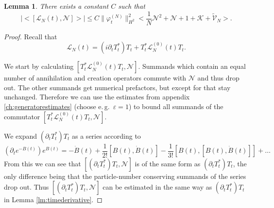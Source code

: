 \documentclass[11pt,a4paper,draft,DIV11]{scrartcl}	%
\newtheorem{lem}[thm]{Lemma}
\newcommand{\Lcal}{\mathcal{L}}		%
\newcommand{\Ncal}{\mathcal{N}}		%
\newcommand{\Kcal}{\mathcal{K}}		%
\newcommand{\tilV}{\tilde{\mathcal{V}}_N}		%
\newcommand{\hc}{\mbox{h.c.}}		%
\newcommand{\norm}[1]{\lVert#1\rVert}	%
\newcommand{\ev}[1]{\big<#1\big>}	%
\newcommand{\ph}{\varphi_t^{(N)}}	%
\newcommand{\bd}{\begin{displaymath}}			%
\newcommand{\ed}{\end{displaymath}}
\begin{document}
\begin{lem}
\label{lem:lncommutatorbound}
There exists a constant $C$ such that
 \bd
  \lvert \ev{[\Lcal_N(t),\Ncal]} \rvert \leq C \norm{\ph}_{H^2}^2 \ev{\frac{1}{N}\Ncal^2 + \Ncal + 1 + \Kcal + \tilV}.
 \ed
\end{lem}
\begin{proof}
Recall that
\[\Lcal_N(t) = (i \partial_t T^\ast_t)T_t + T^\ast_t \Lcal_N^{(0)}(t)T_t.\]

We start by calculating $[T^\ast_t \Lcal_N^{(0)}(t)T_t,\Ncal]$. Summands which contain an equal number of annihilation and creation operators commute with $\Ncal$ and thus drop out. The other summands get numerical prefactors, but except for that stay unchanged. %
Therefore we can use the estimates from appendix \ref{ch:generatorestimates} (choose e.\,g.\ $\varepsilon = 1$) to bound all summands of the commutator $[T^\ast_t \Lcal_N^{(0)}(t)T_t,\Ncal]$.

We expand $(\partial_t T^\ast_t)T_t$ as a series according to
\bd
\left(\partial_t e^{-B(t)} \right) e^{B(t)} = - \dot B(t) +
\frac{1}{2!}[B(t),\dot B(t)] - \frac{1}{3!}[B(t),[B(t),\dot B(t)]] + \dots
\ed
From this we can see that $[(\partial_t T^\ast_t)T_t,\Ncal]$ is of the same form as $(\partial_t T^\ast_t)T_t$, the only difference being that the particle-number conserving summands of the series drop out. Thus  $[(\partial_t T^\ast_t)T_t,\Ncal]$ can be estimated in the same way as $(\partial_t T^\ast_t)T_t$ in Lemma \ref{lm:timederivative}.
\end{proof}
\end{document}
